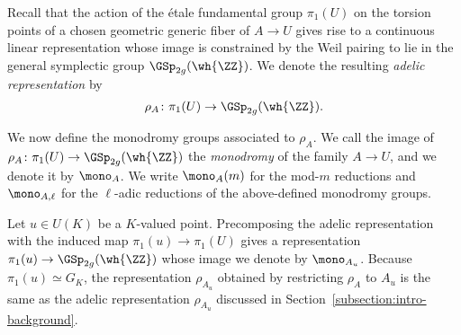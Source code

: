 Recall that the action of the \'{e}tale fundamental group $\pi_1(U)$ on the %
torsion points of a chosen geometric generic fiber of $A \to U$ gives rise to a continuous linear representation whose image is constrained by the Weil pairing to lie in the general symplectic group $\GSp_{2g}(\wh{\ZZ})$. We denote the resulting \emph{adelic representation} by 
\begin{equation}\label{thisisthepartofme}
	\rho_A \colon \pi_1(U) \to \GSp_{2g}(\wh{\ZZ}).
\end{equation}


We now define the monodromy groups associated to $\rho_A$. We call the image of $\rho_A \colon \pi_1(U) \to \GSp_{2g}(\wh{\ZZ})$ the {\it monodromy} of the family $A \to U$, and we denote it by $\mono_A$. We write $\mono_A(m)$ for the mod-$m$ reductions and $\mono_{A,\ell}$ for the $\ell$-adic reductions of the above-defined monodromy groups.

\begin{remark}
Let $u \in U(K)$ be a $K$-valued point. Precomposing the adelic representation with the induced map $\pi_1(u) \to \pi_1(U)$ gives a representation $\pi_1(u) \to \GSp_{2g}(\wh{\ZZ})$ whose image we denote by $\mono_{A_u}$. 
Because $\pi_1(u) \simeq G_K$,
the representation $\rho_{A_u}$ obtained by restricting $\rho_A$ to $A_u$
is the same as the adelic representation $\rho_{A_u}$ discussed in Section~\ref{subsection:intro-background}.
\end{remark}


